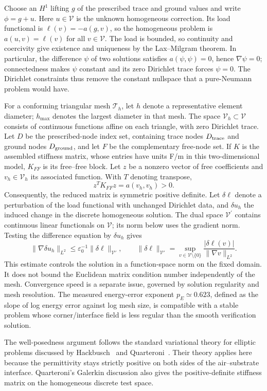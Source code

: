 \documentclass[11pt]{article}
\begin{document}
Choose an $H^1$ lifting $g$ of the prescribed trace and ground values and write $\phi=g+u$. Here $u\in\mathcal V$ is the unknown homogeneous correction. Its load functional is $\ell(v)=-a(g,v)$, so the homogeneous problem is $a(u,v)=\ell(v)$ for all $v\in\mathcal V$. The load is bounded, so continuity and coercivity give existence and uniqueness by the Lax--Milgram theorem. In particular, the difference $\psi$ of two solutions satisfies $a(\psi,\psi)=0$, hence $\nabla\psi=0$; connectedness makes $\psi$ constant and its zero Dirichlet trace forces $\psi=0$. The Dirichlet constraints thus remove the constant nullspace that a pure-Neumann problem would have.

For a conforming triangular mesh $\mathcal T_h$, let $h$ denote a representative element diameter; $h_{\max}$ denotes the largest diameter in that mesh. The space $\mathcal V_h\subset\mathcal V$ consists of continuous functions affine on each triangle, with zero Dirichlet trace. Let $D$ be the prescribed-node index set, containing trace nodes $D_{\rm trace}$ and ground nodes $D_{\rm ground}$, and let $F$ be the complementary free-node set. If $K$ is the assembled stiffness matrix, whose entries have units F/m in this two-dimensional model, $K_{FF}$ is its free--free block. Let $z$ be a nonzero vector of free coefficients and $v_h\in\mathcal V_h$ its associated function. With $T$ denoting transpose, 
\[
z^T K_{FF}z=a(v_h,v_h)>0.
\]
Consequently, the reduced matrix is symmetric positive definite. Let $\delta\ell$ denote a perturbation of the load functional with unchanged Dirichlet data, and $\delta u_h$ the induced change in the discrete homogeneous solution. The dual space $\mathcal V^{\prime}$ contains continuous linear functionals on $\mathcal V$; its norm below uses the gradient norm. Testing the difference equation by $\delta u_h$ gives
\[
\|\nabla\delta u_h\|_{L^2}\le
\varepsilon_0^{-1}\|\delta\ell\|_{\mathcal V'},\qquad
\|\delta\ell\|_{\mathcal V'}=
\sup_{v\in\mathcal V\setminus\{0\}}
\frac{|\delta\ell(v)|}{\|\nabla v\|_{L^2}}.
\]
This estimate controls the solution in a function-space norm on the fixed domain. It does not bound the Euclidean matrix condition number independently of the mesh. Convergence speed is a separate issue, governed by solution regularity and mesh resolution. The measured energy-error exponent $p_E\simeq0.623$, defined as the slope of log energy error against log mesh size, is compatible with a stable problem whose corner/interface field is less regular than the smooth verification solution.

The well-posedness argument follows the standard variational theory for elliptic problems discussed by Hackbusch~\cite[Sec.~7.2]{hackbusch2017} and Quarteroni~\cite[Secs.~3.4 and 4.2]{quarteroni2017}. Their theory applies here because the permittivity stays strictly positive on both sides of the air--substrate interface. Quarteroni's Galerkin discussion also gives the positive-definite stiffness matrix on the homogeneous discrete test space.
\end{document}
